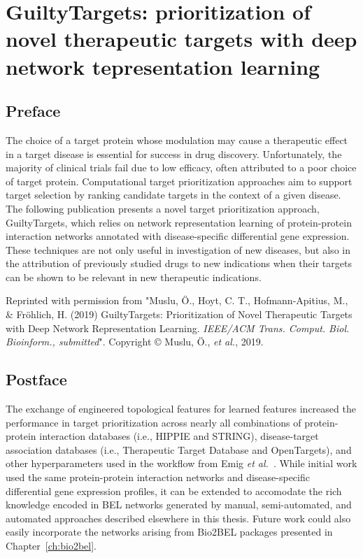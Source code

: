 \chapter{GuiltyTargets: prioritization of novel therapeutic targets with deep network tepresentation learning}
\label{ch:guiltytargets}

\section*{Preface}

The choice of a target protein whose modulation may cause a therapeutic effect in a target disease is essential for success in drug discovery.
Unfortunately, the majority of clinical trials fail due to low efficacy, often attributed to a poor choice of target protein.
Computational target prioritization approaches aim to support target selection by ranking candidate targets in the context of a given disease.
The following publication presents a novel target prioritization approach, GuiltyTargets, which relies on network representation learning of protein-protein interaction networks annotated with disease-specific differential gene expression.
These techniques are not only useful in investigation of new diseases, but also in the attribution of previously studied drugs to new indications when their targets can be shown to be relevant in new therapeutic indications.

\vspace*{\fill}

Reprinted with permission from "Muslu, Ö., Hoyt, C. T., Hofmann-Apitius, M., \& Fröhlich, H. (2019) GuiltyTargets: Prioritization of Novel Therapeutic Targets with Deep Network Representation Learning. \textit{IEEE/ACM Trans. Comput. Biol. Bioinform., submitted}".
Copyright © Muslu, Ö., \textit{et al.}, 2019.



\section*{Postface}

The exchange of engineered topological features for learned features increased the performance in target prioritization across nearly all combinations of protein-protein interaction databases (i.e., HIPPIE and STRING), disease-target association databases (i.e., Therapeutic Target Database and OpenTargets), and other hyperparameters used in the workflow from Emig \textit{et al.}~\cite{Emig2013}.
While initial work used the same protein-protein interaction networks and disease-specific differential gene expression profiles, it can be extended to accomodate the rich knowledge encoded in \ac{BEL} networks generated by manual, semi-automated, and automated approaches described elsewhere in this thesis.
Future work could also easily incorporate the networks arising from Bio2BEL packages presented in Chapter~\ref{ch:bio2bel}.
